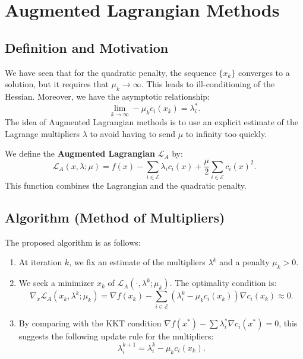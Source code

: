 \section{Augmented Lagrangian Methods}

\subsection{Definition and Motivation}

We have seen that for the quadratic penalty, the sequence $\{x_k\}$ converges to a solution, but it requires that $\mu_k \to \infty$. This leads to ill-conditioning of the Hessian.
Moreover, we have the asymptotic relationship:
\[
    \lim_{k \to \infty} -\mu_k c_i(x_k) = \lambda_i^*.
\]
The idea of Augmented Lagrangian methods is to use an explicit estimate of the Lagrange multipliers $\lambda$ to avoid having to send $\mu$ to infinity too quickly.

We define the \textbf{Augmented Lagrangian} $\mathcal{L}_A$ by:
\[
    \mathcal{L}_A(x, \lambda; \mu) = f(x) - \sum_{i \in \mathcal{E}} \lambda_i c_i(x) + \frac{\mu}{2} \sum_{i \in \mathcal{E}} c_i(x)^2.
\]
This function combines the Lagrangian and the quadratic penalty.

\subsection{Algorithm (Method of Multipliers)}

The proposed algorithm is as follows:
\begin{enumerate}
    \item At iteration $k$, we fix an estimate of the multipliers $\lambda^k$ and a penalty $\mu_k > 0$.
    \item We seek a minimizer $x_k$ of $\mathcal{L}_A(\cdot, \lambda^k; \mu_k)$. The optimality condition is:
    \[
        \nabla_x \mathcal{L}_A(x_k, \lambda^k; \mu_k) = \nabla f(x_k) - \sum_{i \in \mathcal{E}} (\lambda_i^k - \mu_k c_i(x_k)) \nabla c_i(x_k) \approx 0.
    \]
    \item By comparing with the KKT condition $\nabla f(x^*) - \sum \lambda_i^* \nabla c_i(x^*) = 0$, this suggests the following update rule for the multipliers:
    \[
        \lambda_i^{k+1} = \lambda_i^k - \mu_k c_i(x_k).
    \]
\end{enumerate}

